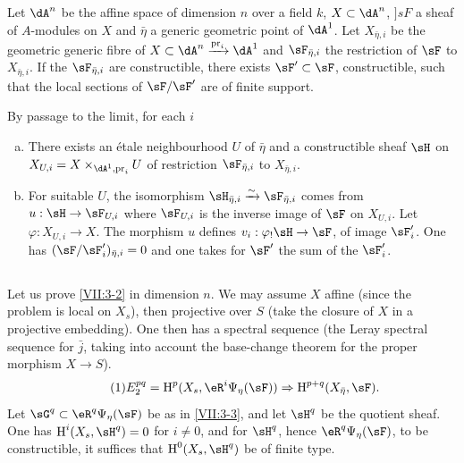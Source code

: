 \begin{lemma_}\label{VII:3-5}
Let $\dA^n$ be the affine space of dimension $n$ over a field $k$,
$X\subset \dA^n$, $]sF$ a sheaf of $A$-modules on $X$ and $\bar\eta$ a
generic geometric point of $\dA^1$. Let $X_{\bar\eta,i}$ be the
geometric generic fibre of
$X\subset \dA^n\xrightarrow{\pr_i} \dA^1$ and $\sF_{\bar\eta,i}$ the restriction
of $\sF$ to $X_{\bar\eta,i}$. If the $\sF_{\bar\eta,i}$ are constructible,
there exists $\sF'\subset \sF$, constructible, such that the local sections of
$\sF/\sF'$ are of finite support.
\end{lemma_}

By passage to the limit, for each $i$
\begin{enumerate}[a)]
  \item There exists an \'etale neighbourhood $U$ of $\bar\eta$ and a
    constructible sheaf $\sH$ on $X_{U,i} = X\times_{\dA^1,\pr_i} U$ of restriction
    $\sF_{\bar\eta,i}$ to $X_{\bar\eta,i}$.
  \item For suitable $U$, the isomorphism
    $\sH_{\bar\eta,i} \iso \sF_{\bar\eta,i}$ comes from $u:\sH\to \sF_{U,i}$
    where $\sF_{U,i}$ is the inverse image of $\sF$ on $X_{U,i}$. Let
    $\varphi:X_{U,i} \to X$. The morphism $u$ defines
    $v_i:\varphi_! \sH \to \sF$, of image $\sF_i'$. One has
    $(\sF/\sF_i')_{\bar\eta,i} = 0$ and one takes for $\sF'$ the sum of the
    $\sF_i'$.
\end{enumerate}




\subsection{}\label{VII:3-6}

Let us prove \ref{VII:3-2} in dimension $n$. We may assume $X$ affine (since the
problem is local on $X_s$), then projective over $S$ (take the closure
of $X$ in a projective embedding). One then has a spectral sequence
\cite[I 2.2.3]{sga7} (the Leray spectral sequence for $\bar j$, taking into account the
base-change theorem for the proper morphism $X\to S$).
\begin{equation*}\tag{1}\label{VII:eq:3-6-1}
  E_2^{p q} = \h^p(X_s,\eR^i\Psi_\eta(\sF)) \Rightarrow \h^{p+q}(X_{\bar\eta},\sF) \text{.}
\end{equation*}
Let $\sG^q\subset \eR^q \Psi_\eta(\sF)$ be as in \ref{VII:3-3}, and let
$\sH^q$ be the quotient sheaf. One has $\h^i(X_s,\sH^q)=0$ for $i\ne 0$, and for
$\sH^q$, hence $\eR^q\Psi_\eta(\sF)$, to be constructible, it suffices that
$\h^0(X_s,\sH^q)$ be of finite type.

